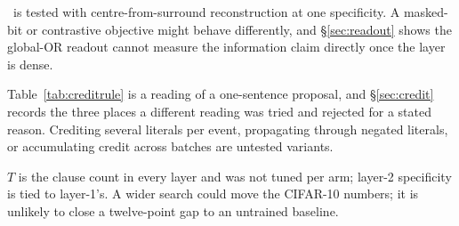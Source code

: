 \ideaA\ is tested with centre-from-surround
reconstruction at one specificity. A masked-bit or contrastive objective might behave
differently, and \S\ref{sec:readout} shows the global-OR readout cannot measure the
information claim directly once the layer is dense.

 Table~\ref{tab:creditrule} is a reading of a one-sentence
proposal, and \S\ref{sec:credit} records the three places a different reading was tried and
rejected for a stated reason. Crediting several literals per event, propagating through
negated literals, or accumulating credit across batches are untested variants.

 $T$ is the clause count in every layer and was not tuned per arm;
layer-2 specificity is tied to layer-1's. A wider search could move the CIFAR-10 numbers; it
is unlikely to close a twelve-point gap to an untrained baseline.

